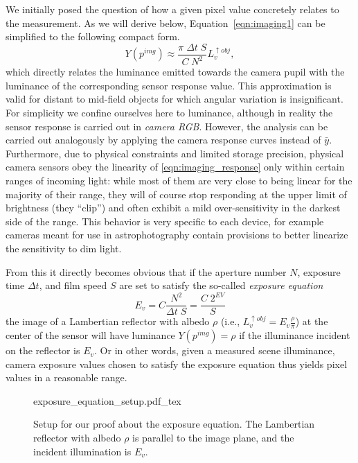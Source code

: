 We initially posed the question of how a given pixel value concretely
relates to the measurement. As we will derive below,
Equation~\eqref{eqn:imaging1} can be simplified to the following
compact form.
\begin{equation}\label{eqn:imaging_response}
  Y(p^{img}) \approx \frac{ \pi\;\Delta t\;S}{C\; N^2} L_v^{\uparrow obj},
\end{equation}
which directly relates the luminance emitted towards the camera pupil
with the luminance of the corresponding sensor response value. This approximation
is valid for distant to mid-field objects for which angular variation
is insignificant. For simplicity we confine ourselves here to luminance, although in
reality the sensor response is carried out in \textit{camera RGB}. However, the
analysis can be carried out analogously by applying the camera
response curves instead of $\bar y$. Furthermore, due to physical
constraints and limited storage precision, physical camera sensors
obey the linearity of \eqref{eqn:imaging_response} only within certain
ranges of incoming light: while most of them are very close to being linear for the
majority of their range, they will of course stop responding at the upper limit of brightness (they ``clip'') and often exhibit a mild over-sensitivity in the darkest side of the range. This behavior is very specific to each device, for example cameras meant for use in astrophotography contain provisions to better linearize the sensitivity to dim light.

From this it directly becomes obvious that if the aperture number $N$,
exposure time $\Delta t$, and film speed $S$ are set to satisfy the
so-called \emph{exposure equation}
\begin{equation}\label{eqn:imaging_Ev}
E_v = C \frac{N^2}{\Delta t\; S} = \frac{C\; 2^{EV}}S
\end{equation}
the image of a Lambertian reflector with albedo $\rho$ (i.e.,
$L_v^{\uparrow obj} = E_v \frac \rho \pi$) at the center of the sensor
will have luminance $Y(p^{img}) = \rho$ if the illuminance incident on
the reflector is $E_v$. Or in other words, given a measured scene
illuminance, camera exposure values chosen to satisfy the exposure
equation thus yields pixel values in a reasonable range.

\begin{figure}[t]
    \centering
    \def\svgwidth{0.9\linewidth}
    {exposure_equation_setup.pdf_tex}
    \caption{\label{fig:exposure_equation_setup}%
        Setup for our proof about the exposure equation. The Lambertian reflector with albedo $\rho$ is parallel to 
        the image plane, and the incident illumination is $E_v$. }
\end{figure}

